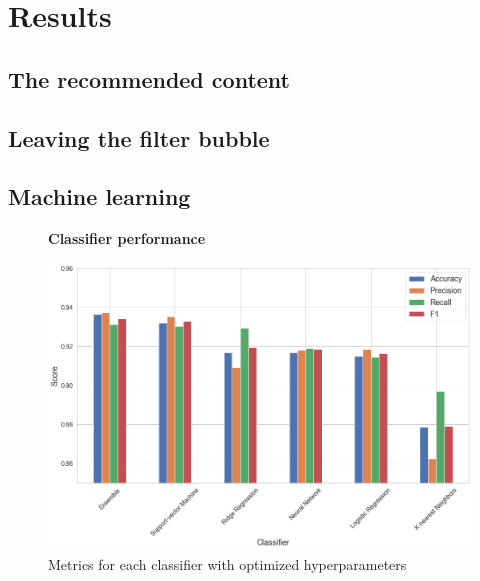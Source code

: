 \documentclass[../main.tex]{subfiles}
\begin{document}
\section{Results}

\subsection{The recommended content}

\subsection{Leaving the filter bubble}

\subsection{Machine learning}

\begin{figure}[t!]
  \textbf{Classifier performance}\par\medskip
  \centering
  \includegraphics[keepaspectratio, width=\textwidth]{images/classifier_results.png}
  \caption{Metrics for each classifier with optimized hyperparameters}
  \label{fig:ML_scores}
\end{figure}
\end{document}
